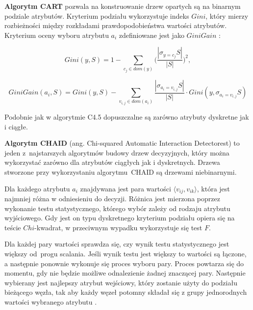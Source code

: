 \documentclass[12pt]{article}
\begin{document}
\textbf{Algorytm CART} pozwala na konstruowanie drzew opartych są na binarnym podziale 
atrybutów. Kryterium podziału wykorzystuje indeks $Gini$, który mierzy
rozbieżności między rozkładami prawdopodobieństwa wartości atrybutów.
Kryterium oceny wyboru atrybutu $a_i$ zdefiniowane jest jako $ GiniGain$ \cite{data-mining-with-decision-trees}:

\begin{equation}
    Gini(y, S) = 1 - \displaystyle\sum\limits_{c_j \in dom(y)}^{} \Bigg(\displaystyle\frac{|\sigma_{y=c_j}S|}{|S|}\Bigg)^2,
\end{equation}

\begin{equation}
    GiniGain(a_i, S) = Gini(y, S) - \displaystyle\sum\limits_{v_{i,j} \in dom(a_i)}^{} \displaystyle\frac{|\sigma_{a_i=v_{i,j}}S|}{|S|} \cdot Gini(y, \sigma_{a_i=v_{i,j}}S)
\end{equation}

\vspace{0.8cm}

Podobnie jak w algorytmie C4.5 dopuszczalne są zarówno atrybuty dyskretne jak i ciągłe.

\newpage

\textbf{Algorytm CHAID} (ang. Chi-squared Automatic Interaction Detectorest) to jeden z~najstarszych algorytmów budowy drzew decyzyjnych, który można wykorzystać 
zarówno dla atrybutów ciągłych jak i dyskretnych. Drzewa stworzone przy wykorzystaniu algorytmu~CHAID są drzewami niebinarnymi.

Dla każdego atrybutu $a_i$ znajdywana jest para wartości $\langle v_{ij}, v_{ik}\rangle$, która jest najmniej różna w odniesieniu do decyzji.
Różnica jest mierzona poprzez wykonanie testu statystycznego, którego wybór zależy od rodzaju atrybutu wyjściowego.
Gdy jest on typu dyskretnego kryterium podziału opiera się na teście $Chi$-kwadrat, w przeciwnym wypadku wykorzystuje się test $F$.

Dla każdej pary wartości sprawdza się, czy wynik testu statystycznego jest większy od~progu scalania.
Jeśli wynik testu jest większy to wartości są łączone, a następnie ponownie wykonuje się proces wyboru pary.
Proces powtarza się do momentu, gdy nie będzie możliwe odnalezienie żadnej znaczącej pary.
Następnie wybierany jest najlepszy atrybut wejściowy, który zostanie użyty do podziału bieżącego węzła,
tak aby każdy węzeł potomny składał się z grupy jednorodnych
wartości wybranego atrybutu \cite{data-mining-with-decision-trees}.
\end{document}
